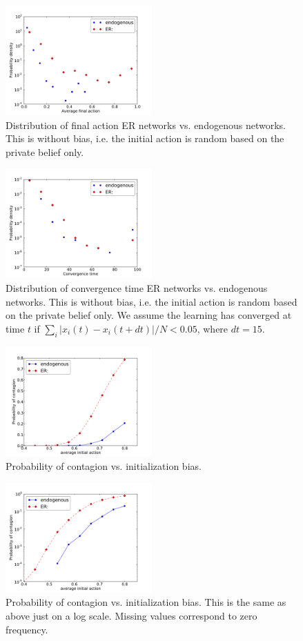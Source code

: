 \documentclass[10pt,a4paper]{article}
\begin{document}
\begin{figure}[ht]
\centering
\includegraphics[width=0.5\textwidth]{figures/ENDO_X_FINAL_DIST}
\caption{Distribution of final action ER networks vs. endogenous networks. This is without bias, i.e. the initial action is random based on the private belief only.}
\label{FIG::ENDO_X_FINAL_DIST}
\end{figure}

\begin{figure}[ht]
\centering
\includegraphics[width=0.5\textwidth]{figures/ENDO_CONV_T_DIST}
\caption{Distribution of convergence time ER networks vs. endogenous networks. This is without bias, i.e. the initial action is random based on the private belief only. We assume the learning has converged at time $t$ if $\sum_i| x_i(t) - x_i(t+dt) | / N < 0.05$, where $dt = 15$.}
\label{FIG::ENDO_CONV_T_DIST}
\end{figure}

\begin{figure}[ht]
\centering
\includegraphics[width=0.5\textwidth]{figures/ENDO_P_CONT}
\caption{Probability of contagion vs. initialization bias.}
\label{FIG::ENDO_P_CONT}
\end{figure}

\begin{figure}[ht]
\centering
\includegraphics[width=0.5\textwidth]{figures/ENDO_P_CONT_LOG}
\caption{Probability of contagion vs. initialization bias. This is the same as above just on a log scale. Missing values correspond to zero frequency.}
\label{FIG::ENDO_P_CONT_LOG}
\end{figure}
\end{document}
